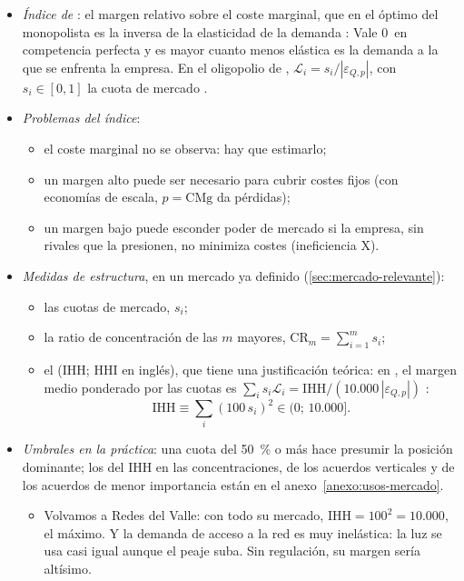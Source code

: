 \documentclass[11pt]{article}
\begin{document}
\begin{itemize}
\item \emph{Índice de }\nocite{Lerner1934Concept}: el margen relativo sobre el coste marginal, que en el óptimo del monopolista es la inversa de la elasticidad de la demanda :
  Vale 0~en competencia perfecta y es mayor cuanto menos elástica es la demanda a la que se enfrenta la empresa. En el oligopolio de , $\mathcal{L}_i=s_i/|\varepsilon_{Q,p}|$, con $s_i\in[0,1]$ la cuota de mercado .
\item \emph{Problemas del índice}:
  \begin{itemize}
  \item el coste marginal no se observa: hay que estimarlo;
  \item un margen alto puede ser necesario para cubrir costes fijos (con economías de escala, $p=\mathrm{CMg}$ da pérdidas);
  \item un margen bajo puede esconder poder de mercado si la empresa, sin rivales que la presionen, no minimiza costes (ineficiencia X).
  \end{itemize}
\item \emph{Medidas de estructura}, en un mercado ya definido (\ref{sec:mercado-relevante}):
  \begin{itemize}
  \item las cuotas de mercado, $s_i$;
  \item la ratio de concentración de las $m$ mayores, $\mathrm{CR}_m=\sum_{i=1}^{m}s_i$;
  \item el  (IHH; HHI en inglés), que tiene una justificación teórica: en , el margen medio ponderado por las cuotas es $\sum_is_i\mathcal{L}_i=\mathrm{IHH}/(10.000\,|\varepsilon_{Q,p}|)$\nocite{CowlingWaterson1976Price}  :
    \begin{equation}
    \mathrm{IHH}\equiv\sum_i(100\,s_i)^2\in(0;\,10.000]. \label{eq:ihh}
    \end{equation}
  \end{itemize}
\item \emph{Umbrales en la práctica}: una cuota del 50~\% o más hace presumir la posición dominante\nocite{TJUE1991AKZO}; los del IHH en las concentraciones, de los acuerdos verticales y de los acuerdos de menor importancia están en el anexo~\ref{anexo:usos-mercado}.
  \begin{itemize}
  \item Volvamos a Redes del Valle: con todo su mercado, $\mathrm{IHH}=100^2=10.000$, el máximo. Y la demanda de acceso a la red es muy inelástica: la luz se usa casi igual aunque el peaje suba. Sin regulación, su margen sería altísimo.
  \end{itemize}
\end{itemize}
\end{document}
